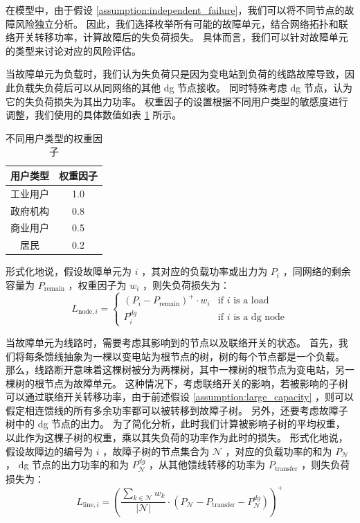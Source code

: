 \documentclass{article}
\begin{document}
在模型中，由于假设 \ref{assumption:independent_failure}，我们可以将不同节点的故障风险独立分析。
因此，我们选择枚举所有可能的故障单元，结合网络拓扑和联络开关转移功率，计算故障后的失负荷损失。
具体而言，我们可以针对故障单元的类型来讨论对应的风险评估。

当故障单元为负载时，我们认为失负荷只是因为变电站到负荷的线路故障导致，因此负载失负荷后可以从同网络的其他 dg 节点接收。
同时特殊考虑 dg 节点，认为它的失负荷损失为其出力功率。
权重因子的设置根据不同用户类型的敏感度进行调整，我们使用的具体数值如表 \ref{tab:weight_factor} 所示。
\begin{table}[h]
  \centering
  \begin{tabular}{|c|c|}
    \hline
    用户类型 & 权重因子 \\
    \hline
    工业用户 & 1.0 \\
    政府机构 & 0.8 \\
    商业用户 & 0.5 \\
    居民 & 0.2 \\
    \hline
  \end{tabular}
  \caption{不同用户类型的权重因子}
  \label{tab:weight_factor}
\end{table}
形式化地说，假设故障单元为 $i$ ，其对应的负载功率或出力为 $P_i$ ，同网络的剩余容量为 $P_{\text{remain}}$ ，权重因子为 $w_i$ ，则失负荷损失为：
\begin{equation}\label{eq:loss_node}
  L_{\text{node},i} =
  \begin{cases}
    (P_i - P_{\text{remain}})^+ \cdot w_i & \text{if } i \text{ is a load} \\
    P_i^{dg} & \text{if } i \text{ is a dg node}
  \end{cases}
\end{equation}

当故障单元为线路时，需要考虑其影响到的节点以及联络开关的状态。
首先，我们将每条馈线抽象为一棵以变电站为根节点的树，树的每个节点都是一个负载。
那么，线路断开意味着这棵树被分为两棵树，其中一棵树的根节点为变电站，另一棵树的根节点为故障单元。
这种情况下，考虑联络开关的影响，若被影响的子树可以通过联络开关转移功率，由于前述假设 \ref{assumption:large_capacity} ，则可以假定相连馈线的所有多余功率都可以被转移到故障子树。
另外，还要考虑故障子树中的 dg 节点的出力。
为了简化分析，此时我们计算被影响子树的平均权重，以此作为这棵子树的权重，乘以其失负荷的功率作为此时的损失。
形式化地说，假设故障边的编号为 $i$ ，故障子树的节点集合为 $\mathcal{N}$ ，对应的负载功率的和为 $P_{\mathcal{N}}$ ，
dg 节点的出力功率的和为 $P_{\mathcal{N}}^{dg}$ ，从其他馈线转移的功率为 $P_{\text{transfer}}$ ，则失负荷损失为：
\begin{equation}\label{eq:loss_line}
  L_{\text{line},i} = \left(
    \frac{\sum_{k\in\mathcal{N}}w_k}{|\mathcal{N}|} \cdot
    (P_{\mathcal{N}} - P_{\text{transfer}} - P_{\mathcal{N}}^{dg})
  \right)^+
\end{equation}
\end{document}
